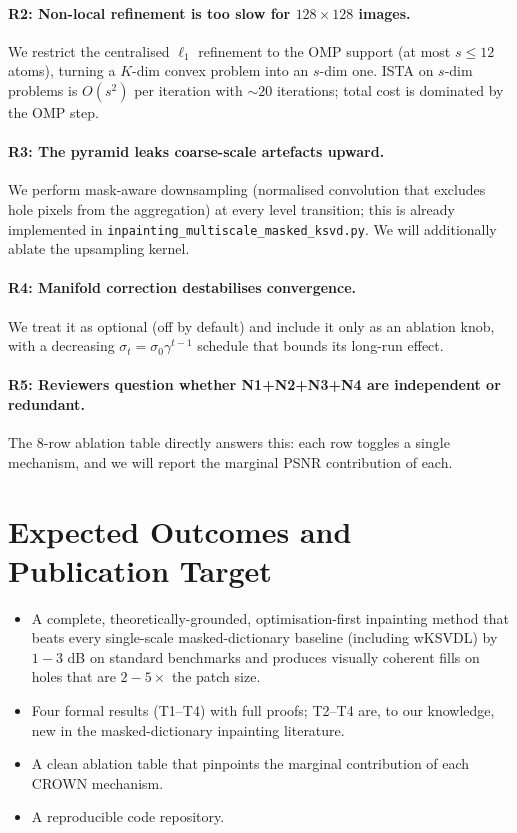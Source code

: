\documentclass[11pt,a4paper]{article}
\theoremstyle{definition}
\theoremstyle{remark}
\begin{document}
\paragraph{R2: Non-local refinement is too slow for $128\times 128$
images.}
We restrict the centralised $\ell_1$ refinement to the OMP support
(at most $s\le 12$ atoms), turning a $K$-dim convex problem into an
$s$-dim one. ISTA on $s$-dim problems is $O(s^2)$ per iteration with
$\sim 20$ iterations; total cost is dominated by the OMP step.

\paragraph{R3: The pyramid leaks coarse-scale artefacts upward.}
We perform mask-aware downsampling (normalised convolution that
excludes hole pixels from the aggregation) at every level transition;
this is already implemented in
\texttt{inpainting\_multiscale\_masked\_ksvd.py}. We will additionally
ablate the upsampling kernel.

\paragraph{R4: Manifold correction destabilises convergence.}
We treat it as optional (off by default) and include it only as an
ablation knob, with a decreasing $\sigma_t=\sigma_0\gamma^{t-1}$
schedule that bounds its long-run effect.

\paragraph{R5: Reviewers question whether N1+N2+N3+N4 are independent
or redundant.}
The 8-row ablation table directly answers this: each row toggles a
single mechanism, and we will report the marginal PSNR contribution of
each.

\section{Expected Outcomes and Publication Target}

\begin{itemize}[itemsep=3pt]
\item A complete, theoretically-grounded, optimisation-first
  inpainting method that beats every single-scale masked-dictionary
  baseline (including wKSVDL) by $1{-}3$ dB on standard benchmarks
  and produces visually coherent fills on holes that are
  $2{-}5\times$ the patch size.
\item Four formal results (T1--T4) with full proofs; T2--T4 are, to
  our knowledge, new in the masked-dictionary inpainting literature.
\item A clean ablation table that pinpoints the marginal contribution
  of each CROWN mechanism.
\item A reproducible code repository.
\end{itemize}
\end{document}

